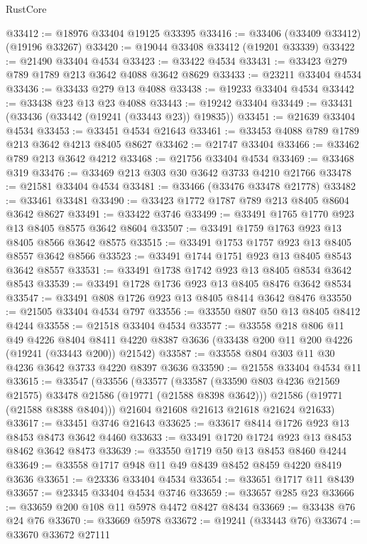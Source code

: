 \begin{lexlean}{RustCore}
\begin{coremodule}
@33412 := @18976 @33404 @19125 @33395
@33416 := @33406 (@33409 @33412) (@19196 @33267)
@33420 := @19044 @33408 @33412 (@19201 @33339)
@33422 := @21490 @33404 @4534
@33423 := @33422 @4534
@33431 := @33423 @279 @789 @1789 @213 @3642 @4088 @3642 @8629
@33433 := @23211 @33404 @4534
@33436 := @33433 @279 @13 @4088
@33438 := @19233 @33404 @4534
@33442 := @33438 @23 @13 @23 @4088
@33443 := @19242 @33404
@33449 := @33431 (@33436 (@33442 (@19241 (@33443 @23)) @19835))
@33451 := @21639 @33404 @4534
@33453 := @33451 @4534 @21643
@33461 := @33453 @4088 @789 @1789 @213 @3642 @4213 @8405 @8627
@33462 := @21747 @33404
@33466 := @33462 @789 @213 @3642 @4212
@33468 := @21756 @33404 @4534
@33469 := @33468 @319
@33476 := @33469 @213 @303 @30 @3642 @3733 @4210 @21766
@33478 := @21581 @33404 @4534
@33481 := @33466 (@33476 @33478 @21778)
@33482 := @33461 @33481
@33490 := @33423 @1772 @1787 @789 @213 @8405 @8604 @3642 @8627
@33491 := @33422 @3746
@33499 := @33491 @1765 @1770 @923 @13 @8405 @8575 @3642 @8604
@33507 := @33491 @1759 @1763 @923 @13 @8405 @8566 @3642 @8575
@33515 := @33491 @1753 @1757 @923 @13 @8405 @8557 @3642 @8566
@33523 := @33491 @1744 @1751 @923 @13 @8405 @8543 @3642 @8557
@33531 := @33491 @1738 @1742 @923 @13 @8405 @8534 @3642 @8543
@33539 := @33491 @1728 @1736 @923 @13 @8405 @8476 @3642 @8534
@33547 := @33491 @808 @1726 @923 @13 @8405 @8414 @3642 @8476
@33550 := @21505 @33404 @4534 @797
@33556 := @33550 @807 @50 @13 @8405 @8412 @4244
@33558 := @21518 @33404 @4534
@33577 := @33558
    @218
    @806
    @11
    @49
    @4226
    @8404
    @8411
    @4220
    @8387
    @3636
    (@33438 @200 @11 @200 @4226 (@19241 (@33443 @200)) @21542)
@33587 := @33558 @804 @303 @11 @30 @4236 @3642 @3733 @4220 @8397 @3636
@33590 := @21558 @33404 @4534 @11
@33615 := @33547
    (@33556
      (@33577
        (@33587 (@33590 @803 @4236 @21569 @21575) @33478 @21586 (@19771 (@21588 @8398 @3642)))
        @21586
        (@19771 (@21588 @8388 @8404)))
      @21604
      @21608
      @21613
      @21618
      @21624
      @21633)
@33617 := @33451 @3746 @21643
@33625 := @33617 @8414 @1726 @923 @13 @8453 @8473 @3642 @4460
@33633 := @33491 @1720 @1724 @923 @13 @8453 @8462 @3642 @8473
@33639 := @33550 @1719 @50 @13 @8453 @8460 @4244
@33649 := @33558 @1717 @948 @11 @49 @8439 @8452 @8459 @4220 @8419 @3636
@33651 := @23336 @33404 @4534
@33654 := @33651 @1717 @11 @8439
@33657 := @23345 @33404 @4534 @3746
@33659 := @33657 @285 @23
@33666 := @33659 @200 @108 @11 @5978 @4472 @8427 @8434
@33669 := @33438 @76 @24 @76
@33670 := @33669 @5978
@33672 := @19241 (@33443 @76)
@33674 := @33670 @33672 @27111

\end{coremodule}
\end{lexlean}
